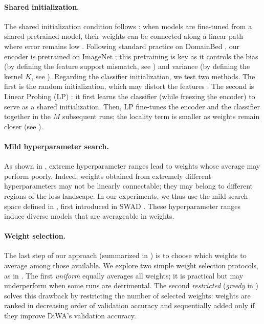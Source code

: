 \paragraph{Shared initialization.}
The shared initialization condition follows \cite{Neyshabur2020}: when models are fine-tuned from a shared pretrained model, their weights can be connected along a linear path where error remains low \cite{Frankle2020}.
Following standard practice on DomainBed \cite{gulrajani2021in}, our encoder is pretrained on ImageNet \cite{krizhevsky2012imagenet}; this pretraining is key as it controls the bias (by defining the feature support mismatch, see ) and variance (by defining the kernel $K$, see ).
Regarding the classifier initialization, we test two methods.
The first is the random initialization, which may distort the features \cite{kumar2022finetuning}.
The second is Linear Probing (LP) \cite{kumar2022finetuning}: it first learns the classifier (while freezing the encoder) to serve as a shared initialization.
Then, LP fine-tunes the encoder and the classifier together in the $M$ subsequent runs; the locality term is smaller as weights remain closer (see \cite{kumar2022finetuning}).%

\paragraph{Mild hyperparameter search.}
As shown in , extreme hyperparameter ranges lead to weights whose average may perform poorly.
Indeed, weights obtained from extremely different hyperparameters may not be linearly connectable; they may belong to different regions of the loss landscape.
In our experiments, we thus use the mild search space defined in , first introduced in SWAD \cite{cha2021wad}.
These hyperparameter ranges induce diverse models that are averageable in weights.

\paragraph{Weight selection.}
The last step of our approach (summarized in ) is to choose which weights to average among those available.
We explore two simple weight selection protocols, as in \cite{Wortsman2022ModelSA}.
The first \textit{uniform} equally averages all weights; it is practical but may underperform when some runs are detrimental.
The second \textit{restricted} (\textit{greedy} in \cite{Wortsman2022ModelSA}) solves this drawback by restricting the number of selected weights: weights are ranked in decreasing order of validation accuracy and sequentially added only if they improve DiWA's validation accuracy.

